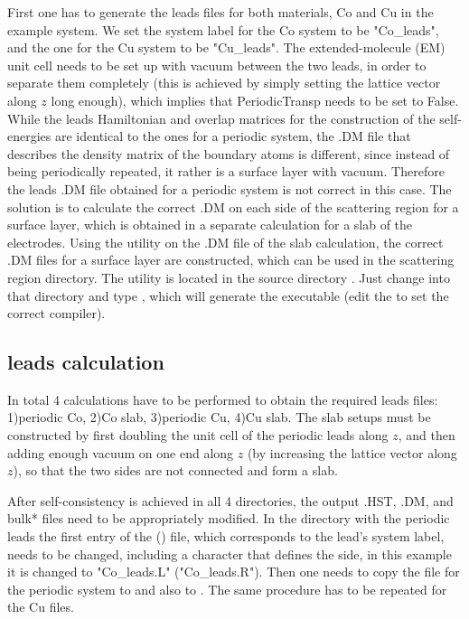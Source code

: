 \documentclass[11pt]{article}
\begin{document}
First one has to generate the leads files for both materials, Co and Cu in the example system. We set the system label for the Co system to be "Co\_leads", and the one for the Cu system to be "Cu\_leads". The extended-molecule (EM) unit cell needs to be set up with vacuum between the two leads, in order to separate them completely (this is achieved by simply setting the lattice vector along $z$ long enough), which implies that PeriodicTransp needs to be set to False. While the leads Hamiltonian and overlap matrices for the construction of the self-energies are identical to the ones for a periodic system, the .DM file that describes the density matrix of the boundary atoms is different, since instead of being periodically repeated, it rather is a surface layer with vacuum.
Therefore the leads .DM file obtained for a periodic system is not correct in this case. The solution is to calculate the correct .DM on each side of the scattering region for a surface layer, which is obtained in a separate calculation for a slab of the electrodes. Using the  utility on the .DM file of the slab calculation, the correct .DM files for a surface layer are constructed, which can be used in the scattering region directory. The  utility is located in the source directory . Just change into that directory and type , which will generate the  executable (edit the  to set the correct compiler).



\subsection{leads calculation}

In total 4 calculations have to be performed to obtain the required leads files: 1)periodic Co, 2)Co slab, 3)periodic Cu, 4)Cu slab. The slab setups must be constructed by first doubling the unit cell of the periodic leads along $z$, and then adding enough vacuum on one end along $z$ (by increasing the lattice vector along $z$), so that the two sides are not connected and form a slab. 

After self-consistency is achieved in all 4 directories, the output .HST, .DM, and bulk* files need to be appropriately modified. In the directory with the periodic leads the first entry of the  () file, which corresponds to the lead's system label, needs to be changed, including a character that defines the side, in this example it is changed to "Co\_leads.L" ("Co\_leads.R"). Then one needs to copy the  file for the periodic system to  and also to . The same procedure has to be repeated for the Cu files.
\end{document}

